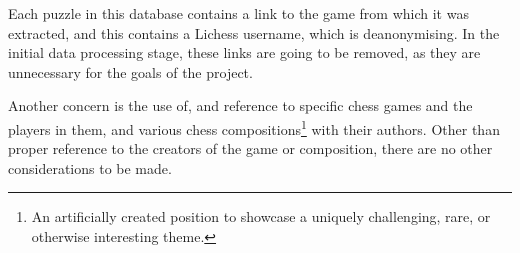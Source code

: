 Each puzzle in this database contains a link to the game from which it was
extracted, and this contains a Lichess username, which is deanonymising. In the
initial data processing stage, these links are going to be removed, as they are
unnecessary for the goals of the project.

Another concern is the use of, and reference to specific chess games and the
players in them, and various chess compositions\footnote{An artificially
created position to showcase a uniquely challenging, rare, or otherwise
interesting theme.} with their authors. Other than proper reference to the
creators of the game or composition, there are no other considerations to be
made.

